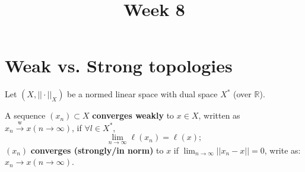 \documentclass{article}
\title{Week 8}
\begin{document}
  
\maketitle
\section{Weak vs. Strong topologies}
Let $(X, || \cdot ||_X)$ be a normed linear space with dual space $X^*$ (over $\mathbb{R}$).

\begin{definition}\nl
A sequence $(x_n) \subset X$ \textbf{converges weakly} to $x\in X$, written as $x_n \xrightarrow{\text{w}} x (n \rightarrow \infty)$, if $\forall l \in X^*$, 
    $$\lim_{n\rightarrow \infty} \ell(x_n) = \ell(x);$$
$(x_n)$ \textbf{converges (strongly/in norm)} to $x$ if $\lim_{n\rightarrow \infty} ||x_n - x|| = 0$, write as: $x_n \rightarrow x (n\rightarrow \infty).$
\end{definition}
\end{document}
